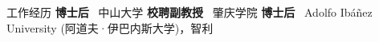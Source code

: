 \begin{rubric}{工作经历}
\entry*[2021.03 -- 2023.08]%
    \textbf{博士后}~ 中山大学 
\entry*[2023.08 -- 至今~~~~~]%
    \textbf{校聘副教授}~ 肇庆学院 
\entry*[2024.12 -- 2027.12]%
    \textbf{博士后}~ Adolfo Ibáñez University (阿道夫·伊巴内斯大学)，智利
%
%
\end{rubric}
